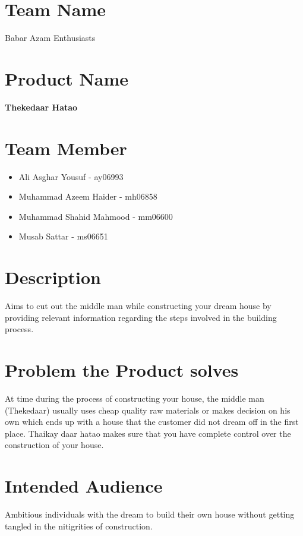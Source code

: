 \documentclass{article}
\begin{document}

\setcounter{page}{1}
{} %

\section{Team Name}
\large{Babar Azam Enthusiasts}

\section{Product Name}
\textbf{Thekedaar Hatao}

\section{Team Member}
\begin{itemize}
    \item Ali Asghar Yousuf - ay06993
    \item Muhammad Azeem Haider - mh06858
    \item Muhammad Shahid Mahmood - mm06600
    \item Musab Sattar - ms06651
\end{itemize}

\section{Description}
Aims to cut out the middle man while constructing your dream house by providing
relevant information regarding the steps involved in the building process.

\section{Problem the Product solves}
At time during the process of constructing your house, the middle man
(Thekedaar) usually uses cheap quality raw materials or makes decision on his
own which ends up with a house that the customer did not dream off in the first
place. Thaikay daar hatao makes sure that you have complete control over the
construction of your house.

\section{Intended Audience}
Ambitious individuals with the dream to build their own house without getting
tangled in the nitigrities of construction.
\end{document}
